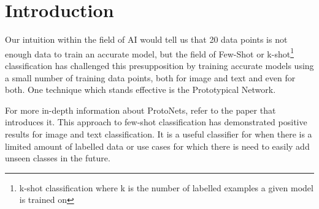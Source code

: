 \documentclass[manuscript, anonymous=true, review=true]{acmart}
\begin{document}


\maketitle

\section{Introduction}
  Our intuition within the field of AI would tell us that 20 data points is not enough data to train an accurate model, but the field of Few-Shot or k-shot\footnote{k-shot classification where k is the number of labelled examples a given model is trained on} classification has challenged this presupposition by training accurate models using a small number of training data points, both for image\cite{NIPS2017_cb8da676, hou2022closerlookprototypeclassifier, JI202081} and text\cite{sun-etal-2019-hierarchical, electronics11152423, Sourati2023-bq, Liu2025-gf} and even for both\cite{Pahde_2021_WACV}.
  One technique which stands effective is the Prototypical Network.

  For more in-depth information about ProtoNets, refer to the paper that introduces it\cite{NIPS2017_cb8da676}.
  This approach to few-shot classification has demonstrated positive results for image\cite{NIPS2017_cb8da676,hou2022closerlookprototypeclassifier, JI202081} and text classification\cite{sun-etal-2019-hierarchical,electronics11152423,Sourati2023-bq,Liu2025-gf}. It is a useful classifier for when there is a limited amount of labelled data or use cases for which there is need to easily add unseen classes in the future.
\end{document}
